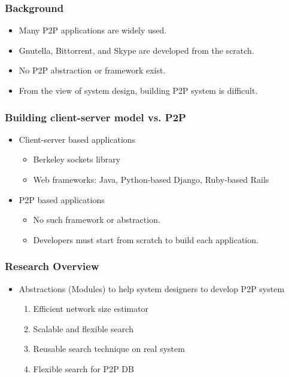 \documentclass[red]{beamer}
\begin{document}
\begin{frame}
\frametitle{Background}
\begin{itemize}
\item Many P2P applications are widely used.
\item Gnutella, Bittorrent, and Skype are developed from the scratch.
\item No P2P abstraction or framework exist.
\item From the view of system design, building P2P system is difficult.
\end{itemize}
\end{frame}
\begin{frame}
\frametitle{Building client-server model vs. P2P}
\begin{itemize}
\item Client-server based applications
\begin{itemize}
\item Berkeley sockets library
\item Web frameworks: Java, Python-based Django, Ruby-based Rails
\end{itemize}
\item P2P based applications
\begin{itemize}
\item No such framework or abstraction.
\item Developers must start from scratch to build each application. 
\end{itemize}
\end{itemize}
\end{frame}
\begin{frame}
\frametitle{Research Overview}
\begin{itemize}
\item Abstractions (Modules) to help system designers to develop P2P system
\begin{enumerate}
\item Efficient network size estimator
\item Scalable and flexible search
\item Reusable search technique on real system
\item Flexible search for P2P DB
\end{enumerate}
\end{itemize}
\end{frame}
\end{document}
